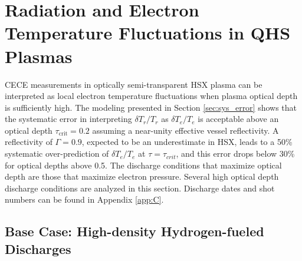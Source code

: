 \documentclass[%
 aip,
 amsmath,amssymb,
 reprint,%
]{revtex4-1}
\begin{document}
\section{Radiation and Electron Temperature Fluctuations in QHS Plasmas} 

CECE measurements in optically semi-transparent HSX plasma can be interpreted as local electron temperature fluctuations when plasma optical depth is sufficiently high. The modeling presented in Section \ref{sec:sys_error} shows that the systematic error in interpreting $\delta T_r/T_r$ as $\delta T_e/T_e$ is acceptable above an optical depth $\tau_\mathrm{crit}=0.2$ assuming a near-unity effective vessel reflectivity. A reflectivity of $\Gamma=0.9$, expected to be an underestimate in HSX, leads to a 50\% systematic over-prediction of $\delta T_e/T_e$ at $\tau=\tau_{crit}$, and this error drops below 30\% for optical depths above 0.5. The discharge conditions that maximize optical depth are those that maximize electron pressure. Several high optical depth discharge conditions are analyzed in this section. Discharge dates and shot numbers can be found in Appendix \ref{app:C}.


\subsection{Base Case: High-density Hydrogen-fueled Discharges}
\end{document}

